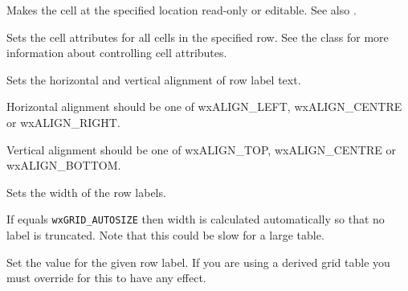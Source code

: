 \label{wxgridsetorcalcrowsizes}




\label{wxgridsetreadonly}


Makes the cell at the specified location read-only or editable.
See also .



\label{wxgridsetrowattr}


Sets the cell attributes for all cells in the specified row.
See the  class for more information
about controlling cell attributes.



\label{wxgridsetrowlabelalignment}


Sets the horizontal and vertical alignment of row label text.

Horizontal alignment should be one of wxALIGN\_LEFT, wxALIGN\_CENTRE or wxALIGN\_RIGHT.

Vertical alignment should be one of wxALIGN\_TOP, wxALIGN\_CENTRE or wxALIGN\_BOTTOM.



\label{wxgridsetrowlabelsize}


Sets the width of the row labels.

If  equals \texttt{wxGRID\_AUTOSIZE} then width is calculated automatically
so that no label is truncated. Note that this could be slow for a large table.



\label{wxgridsetrowlabelvalue}


Set the value for the given row label. If you are using a derived grid table you must
override 
for this to have any effect.



